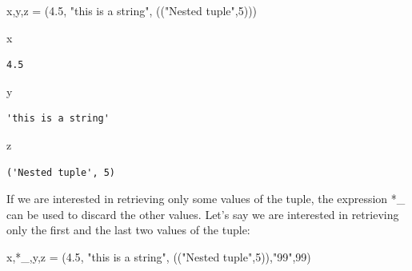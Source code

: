 \documentclass[
  letterpaper,
  DIV=11,
  numbers=noendperiod]{scrreprt}
\newenvironment{Shaded}{\begin{snugshade}}{\end{snugshade}}
\newcommand{\DecValTok}[1]{\textcolor[rgb]{0.68,0.00,0.00}{#1}}
\newcommand{\FloatTok}[1]{\textcolor[rgb]{0.68,0.00,0.00}{#1}}
\newcommand{\NormalTok}[1]{\textcolor[rgb]{0.00,0.23,0.31}{#1}}
\newcommand{\OperatorTok}[1]{\textcolor[rgb]{0.37,0.37,0.37}{#1}}
\newcommand{\StringTok}[1]{\textcolor[rgb]{0.13,0.47,0.30}{#1}}
\begin{document}
\begin{Shaded}
\begin{Highlighting}[]
\NormalTok{x,y,z  }\OperatorTok{=}\NormalTok{ (}\FloatTok{4.5}\NormalTok{, }\StringTok{"this is a string"}\NormalTok{, ((}\StringTok{"Nested tuple"}\NormalTok{,}\DecValTok{5}\NormalTok{)))}
\end{Highlighting}
\end{Shaded}

\begin{Shaded}
\begin{Highlighting}[]
\NormalTok{x}
\end{Highlighting}
\end{Shaded}

\begin{verbatim}
4.5
\end{verbatim}

\begin{Shaded}
\begin{Highlighting}[]
\NormalTok{y}
\end{Highlighting}
\end{Shaded}

\begin{verbatim}
'this is a string'
\end{verbatim}

\begin{Shaded}
\begin{Highlighting}[]
\NormalTok{z}
\end{Highlighting}
\end{Shaded}

\begin{verbatim}
('Nested tuple', 5)
\end{verbatim}

If we are interested in retrieving only some values of the tuple, the
expression *\_ can be used to discard the other values. Let's say we are
interested in retrieving only the first and the last two values of the
tuple:

\begin{Shaded}
\begin{Highlighting}[]
\NormalTok{x,}\OperatorTok{*}\NormalTok{\_,y,z  }\OperatorTok{=}\NormalTok{ (}\FloatTok{4.5}\NormalTok{, }\StringTok{"this is a string"}\NormalTok{, ((}\StringTok{"Nested tuple"}\NormalTok{,}\DecValTok{5}\NormalTok{)),}\StringTok{"99"}\NormalTok{,}\DecValTok{99}\NormalTok{)}
\end{Highlighting}
\end{Shaded}
\end{document}
